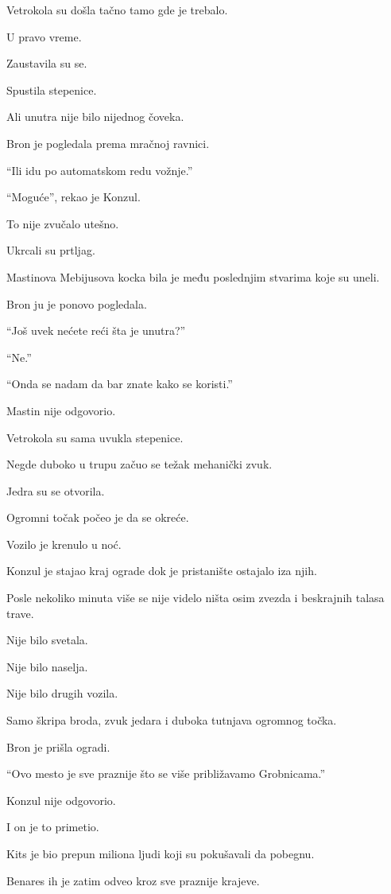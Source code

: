 Vetrokola su došla tačno tamo gde je trebalo.

U pravo vreme.

Zaustavila su se.

Spustila stepenice.

Ali unutra nije bilo nijednog čoveka.

Bron je pogledala prema mračnoj ravnici.

``Ili idu po automatskom redu vožnje.''

``Moguće'', rekao je Konzul.

To nije zvučalo utešno.

\bigskip

Ukrcali su prtljag.

Mastinova Mebijusova kocka bila je među poslednjim stvarima koje su uneli.

Bron ju je ponovo pogledala.

``Još uvek nećete reći šta je unutra?''

``Ne.''

``Onda se nadam da bar znate kako se koristi.''

Mastin nije odgovorio.

Vetrokola su sama uvukla stepenice.

Negde duboko u trupu začuo se težak mehanički zvuk.

Jedra su se otvorila.

Ogromni točak počeo je da se okreće.

Vozilo je krenulo u noć.

\bigskip

Konzul je stajao kraj ograde dok je pristanište ostajalo iza njih.

Posle nekoliko minuta više se nije videlo ništa osim zvezda i beskrajnih talasa trave.

Nije bilo svetala.

Nije bilo naselja.

Nije bilo drugih vozila.

Samo škripa broda, zvuk jedara i duboka tutnjava ogromnog točka.

Bron je prišla ogradi.

``Ovo mesto je sve praznije što se više približavamo Grobnicama.''

Konzul nije odgovorio.

I on je to primetio.

Kits je bio prepun miliona ljudi koji su pokušavali da pobegnu.

Benares ih je zatim odveo kroz sve praznije krajeve.

